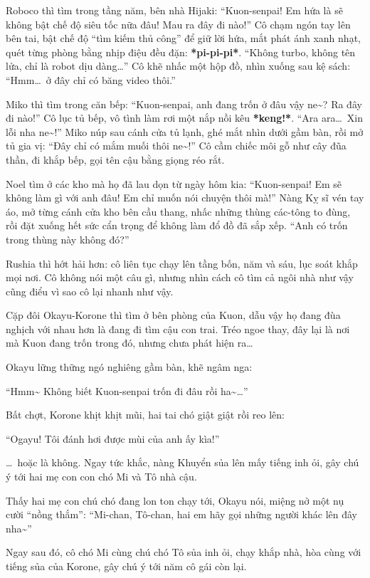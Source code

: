 \documentclass[../main.tex]{subfiles}
\begin{document}
Roboco thì tìm trong tầng năm, bên nhà Hijaki: ``Kuon-senpai! Em hứa là sẽ không bật chế độ siêu tốc nữa đâu! Mau ra đây đi nào!'' Cô chạm ngón tay lên bên tai, bật chế độ ``tìm kiếm thủ công'' để giữ lời hứa, mắt phát ánh xanh nhạt, quét từng phòng bằng nhịp điệu đều đặn: \textbf{*pi-pi-pi*}. ``Không turbo, không tên lửa, chỉ là robot dịu dàng\dots'' Cô khẽ nhấc một hộp đồ, nhìn xuống sau kệ sách: ``Hmm\dots\ ở đây chỉ có băng video thôi.''

Miko thì tìm trong căn bếp: ``Kuon-senpai, anh đang trốn ở đâu vậy ne\~{}? Ra đây đi nào!'' Cô lục tủ bếp, vô tình làm rơi một nắp nồi kêu \textbf{*keng!*}. ``Ara ara\dots\ Xin lỗi nha ne\~{}!'' Miko núp sau cánh cửa tủ lạnh, ghé mắt nhìn dưới gầm bàn, rồi mở tủ gia vị: ``Đây chỉ có mắm muối thôi ne\~{}!'' Cô cầm chiếc môi gỗ như cây đũa thần, đi khắp bếp, gọi tên cậu bằng giọng réo rắt.

Noel tìm ở các kho mà họ đã lau dọn từ ngày hôm kia: ``Kuon-senpai! Em sẽ không làm gì với anh đâu! Em chỉ muốn nói chuyện thôi mà!'' Nàng Kỵ sĩ vén tay áo, mở từng cánh cửa kho bên cầu thang, nhấc những thùng các-tông to đùng, rồi đặt xuống hết sức cẩn trọng để không làm đổ đồ đã sắp xếp. ``Anh có trốn trong thùng này không đó?''

Rushia thì hớt hải hơn: cô liên tục chạy lên tầng bốn, năm và sáu, lục soát khắp mọi nơi. Cô không nói một câu gì, nhưng nhìn cách cô tìm cả ngôi nhà như vậy cũng điểu vì sao cô lại nhanh như vậy.

Cặp đôi Okayu-Korone thì tìm ở bên phòng của Kuon, dẫu vậy họ đang đùa nghịch với nhau hơn là đang đi tìm cậu con trai. Tréo ngoe thay, đây lại là nơi mà Kuon đang trốn trong đó, nhưng chưa phát hiện ra\dots

Okayu lững thững ngó nghiêng gầm bàn, khẽ ngâm nga:

``Hmm\~{} Không biết Kuon-senpai trốn đi đâu rồi ha\~{}\dots''

Bất chợt, Korone khịt khịt mũi, hai tai chó giật giật rồi reo lên:

``Ogayu! Tôi đánh hơi được mùi của anh ấy kìa!''

\dots\ hoặc là không. Ngay tức khắc, nàng Khuyển sủa lên mấy tiếng inh ỏi, gây chú ý tới hai mẹ con con chó Mi và Tô nhà cậu.

Thấy hai mẹ con chú chó đang lon ton chạy tới, Okayu nói, miệng nở một nụ cười ``nồng thắm'': ``Mi-chan, Tô-chan, hai em hãy gọi những người khác lên đây nha\~{}''

Ngay sau đó, cô chó Mi cùng chú chó Tô sủa inh ỏi, chạy khắp nhà, hòa cùng với tiếng sủa của Korone, gây chú ý tới năm cô gái còn lại.
\end{document}
